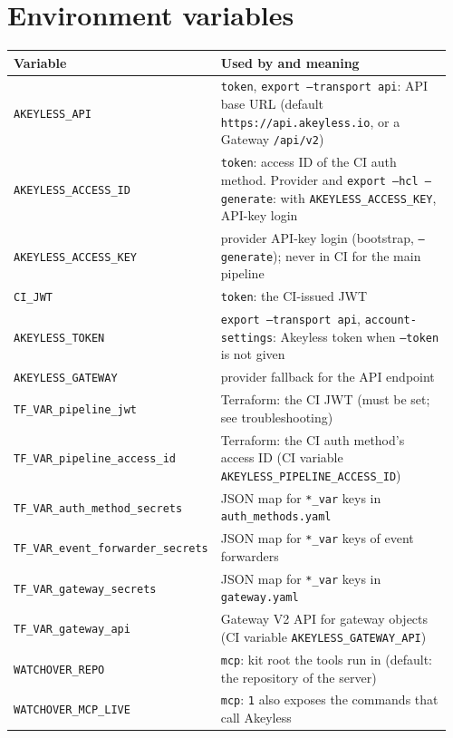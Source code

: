 \chapter{Environment variables}\label{app:env}
{\small
\begin{longtable}{@{}>{\raggedright\arraybackslash}p{0.34\linewidth}>{\raggedright\arraybackslash}p{0.62\linewidth}@{}}
\toprule
\textbf{Variable} & \textbf{Used by and meaning} \\ \midrule\endhead
\texttt{AKEYLESS\_API} & \texttt{token}, \texttt{export --transport api}: API base URL (default \texttt{https://api.akeyless.io}, or a Gateway \texttt{/api/v2}) \\
\texttt{AKEYLESS\_ACCESS\_ID} & \texttt{token}: access ID of the CI auth method. Provider and \texttt{export --hcl --generate}: with \texttt{AKEYLESS\_ACCESS\_KEY}, API-key login \\
\texttt{AKEYLESS\_ACCESS\_KEY} & provider API-key login (bootstrap, \texttt{--generate}); never in CI for the main pipeline \\
\texttt{CI\_JWT} & \texttt{token}: the CI-issued JWT \\
\texttt{AKEYLESS\_TOKEN} & \texttt{export --transport api}, \texttt{account-settings}: Akeyless token when \texttt{--token} is not given \\
\texttt{AKEYLESS\_GATEWAY} & provider fallback for the API endpoint \\
\texttt{TF\_VAR\_pipeline\_jwt} & Terraform: the CI JWT (must be set; see troubleshooting) \\
\texttt{TF\_VAR\_pipeline\_access\_id} & Terraform: the CI auth method's access ID (CI variable \texttt{AKEYLESS\_PIPELINE\_ACCESS\_ID}) \\
\texttt{TF\_VAR\_auth\_method\_secrets} & JSON map for \texttt{*\_var} keys in \texttt{auth\_methods.yaml} \\
\texttt{TF\_VAR\_event\_forwarder\_secrets} & JSON map for \texttt{*\_var} keys of event forwarders \\
\texttt{TF\_VAR\_gateway\_secrets} & JSON map for \texttt{*\_var} keys in \texttt{gateway.yaml} \\
\texttt{TF\_VAR\_gateway\_api} & Gateway V2 API for gateway objects (CI variable \texttt{AKEYLESS\_GATEWAY\_API}) \\
\texttt{WATCHOVER\_REPO} & \texttt{mcp}: kit root the tools run in (default: the repository of the server) \\
\texttt{WATCHOVER\_MCP\_LIVE} & \texttt{mcp}: \texttt{1} also exposes the commands that call Akeyless \\
\bottomrule
\end{longtable}}

